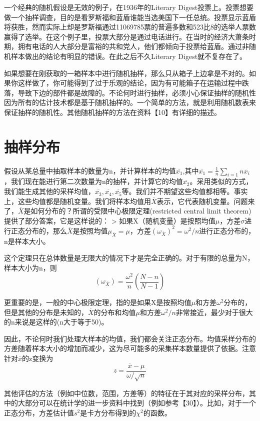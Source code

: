 \documentclass[cn,11pt,chinese]{elegantbook}
\begin{document}
{一个经典的随机假设是无效的例子，在1936年的Literary Digest投票上。投票想要做一个抽样调查，目的是看罗斯福和蓝盾谁能当选美国下一任总统。投票显示蓝盾将获胜，然而实际上却是罗斯福通过11069785票的普遍多数和523比8的选举人票数赢得了选举。在这个例子里，投票大部分是通过电话进行。在当时的经济大萧条时期，拥有电话的人大部分是富裕的共和党人，他们都倾向于投票给蓝盾。通过非随机样本做出的结论有明显的错误。在此之后不久Literary Digest就不复存在了。

如果想要在刚获取的一箱样本中进行随机抽样，那么只从箱子上边拿是不对的。如果你这样做了，你可能得到了过于乐观的结论，因为有可能箱子在运输过程中跌落，导致下边的部件都是故障的。不论何时进行抽样，必须小心保证抽样的随机性因为所有的估计技术都是基于随机抽样的。一个简单的方法，就是利用随机数表来保证抽样的随机性。其他随机抽样的方法在资料【10】有详细的描述。

\section{抽样分布}

假设从某总量中抽取样本的数量为n，并计算样本的均值$\overline{x_1}$,其中$\overline{x_1}=\frac{1}{n}\sum_{i=1}{n}x_i$，我们现在能进行第二次数量为n的抽样，并计算它的均值$\overline{x_2}$。采用类似的方式，我们能生成其他的采样均值，$\overline{x_3},\overline{x_4},\overline{x_5}$等。我们并不期望这些均值都相等。事实上，这些均值都是随机变量。我们将样本均值用$\overline{X}$表示，它代表随机变量。问题来了，$\overline{X}$是如何分布的？所谓的受限中心极限定理(restricted central limit theorem)提供了部分答案，它是这样说的：
> 如果X（随机变量）是按照均值$\mu$，方差$\sigma$进行正态分布的，那么$\overline{X}$是按照均值$\mu_{\overline{X}}=\mu$，方差$(\omega_{\overline{X}})^2=\omega^2/n$进行正态分布的，n是样本大小。

这个定理只在总体数量是无限大的情况下才是完全正确的。对于有限的总量为N，样本大小为n，则
$$(\omega_{\overline{X}})=\frac{\omega^2}{n}(\frac{N-n}{N-1})$$

更重要的是，一般的中心极限定理，指的是如果X是按照均值$\mu$和方差$\omega^2$分布的，但是其他的分布是未知的，$\overline{X}$的分布和均值$\mu$和方差$\omega^2/n$非常接近，最少对于很大的n来说是这样的(n大于等于50)。

因此，不论何时我们处理大样本的均值，我们都会关注正态分布。均值采样分布的方差随着样本大小的增加而减少，这为尽可能多的采集样本数量提供了依据。注意针对$\overline{x}$的z变换为
$$z=\frac{\overline{x}-\mu}{\omega/\sqrt{n}}$$

其他评估的方法（例如中位数，范围，方差等）的特征在于其对应的采样分布，其中的大部分可以在统计学的进一步资料中找到（例如参考【30】）。比如，对于一个正态分布，方差估计值$s^2$是卡方分布得到的$\chi^2$的函数。

}
\end{document}
